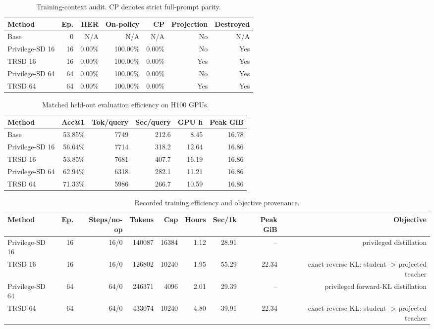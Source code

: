 \begin{table}[t]
\centering
\small
\caption{Training-context audit. CP denotes strict full-prompt parity.}
\label{tab:trsd-cleanliness}
\begin{tabular}{lrrrrrr}
\toprule
Method & Ep. & HER & On-policy & CP & Projection & Destroyed \\
\midrule
Base & 0 & N/A & N/A & N/A & No & N/A \\
Privilege-SD 16 & 16 & 0.00\% & 100.00\% & 0.00\% & No & Yes \\
TRSD 16 & 16 & 0.00\% & 100.00\% & 0.00\% & Yes & Yes \\
Privilege-SD 64 & 64 & 0.00\% & 100.00\% & 0.00\% & No & Yes \\
TRSD 64 & 64 & 0.00\% & 100.00\% & 0.00\% & Yes & Yes \\
\bottomrule
\end{tabular}
\end{table}

\begin{table}[t]
\centering
\small
\caption{Matched held-out evaluation efficiency on H100 GPUs.}
\label{tab:trsd-eval-efficiency}
\begin{tabular}{lrrrrr}
\toprule
Method & Acc@1 & Tok/query & Sec/query & GPU h & Peak GiB \\
\midrule
Base & 53.85\% & 7749 & 212.6 & 8.45 & 16.78 \\
Privilege-SD 16 & 56.64\% & 7714 & 318.2 & 12.64 & 16.86 \\
TRSD 16 & 53.85\% & 7681 & 407.7 & 16.19 & 16.86 \\
Privilege-SD 64 & 62.94\% & 6318 & 282.1 & 11.21 & 16.86 \\
TRSD 64 & 71.33\% & 5986 & 266.7 & 10.59 & 16.86 \\
\bottomrule
\end{tabular}
\end{table}

\begin{table}[t]
\centering
\small
\caption{Recorded training efficiency and objective provenance.}
\label{tab:trsd-train-efficiency}
\begin{tabular}{lrrrrrrrr}
\toprule
Method & Ep. & Steps/no-op & Tokens & Cap & Hours & Sec/1k & Peak GiB & Objective \\
\midrule
Privilege-SD 16 & 16 & 16/0 & 140087 & 16384 & 1.12 & 28.91 & -- & privileged distillation \\
TRSD 16 & 16 & 16/0 & 126802 & 10240 & 1.95 & 55.29 & 22.34 & exact reverse KL: student -> projected teacher \\
Privilege-SD 64 & 64 & 64/0 & 246371 & 4096 & 2.01 & 29.39 & -- & privileged forward-KL distillation \\
TRSD 64 & 64 & 64/0 & 433074 & 10240 & 4.80 & 39.91 & 22.34 & exact reverse KL: student -> projected teacher \\
\bottomrule
\end{tabular}
\end{table}

